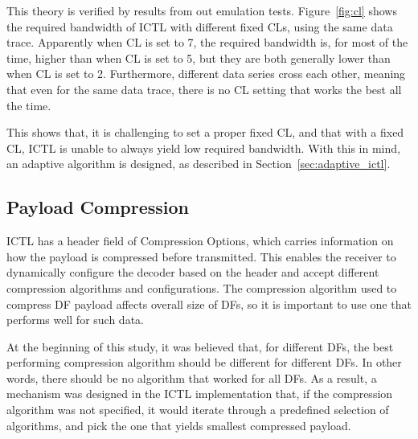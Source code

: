 \documentclass[12pt]{report}
\begin{document}
This theory is verified by results from out emulation tests. Figure~\ref{fig:cl} shows the required bandwidth of ICTL with different fixed CLs, using the same data trace. Apparently when CL is set to 7, the required bandwidth is, for most of the time, higher than when CL is set to 5, but they are both generally lower than when CL is set to 2. Furthermore, different data series cross each other, meaning that even for the same data trace, there is no CL setting that works the best all the time.

This shows that, it is challenging to set a proper fixed CL, and that with a fixed CL, ICTL is unable to always yield low required bandwidth. With this in mind, an adaptive algorithm is designed, as described in Section~\ref{sec:adaptive_ictl}.

\subsection{Payload Compression}
\label{sec:payload_compression}

ICTL has a header field of Compression Options, which carries information on how the payload is compressed before transmitted. This enables the receiver to dynamically configure the decoder based on the header and accept different compression algorithms and configurations. The compression algorithm used to compress DF payload affects overall size of DFs, so it is important to use one that performs well for such data.

At the beginning of this study, it was believed that, for different DFs, the best performing compression algorithm should be different for different DFs. In other words, there should be no algorithm that worked for all DFs. As a result, a mechanism was designed in the ICTL implementation that, if the compression algorithm was not specified, it would iterate through a predefined selection of algorithms, and pick the one that yields smallest compressed payload.
\end{document}
